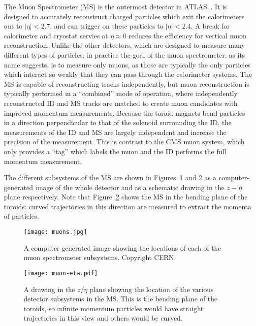 The Muon Spectrometer (MS) is the outermost detector in ATLAS~\cite{ATLASPaper}. It is designed to accurately reconstruct charged particles which exit the calorimeters out to $|\eta| < 2.7$, and can trigger on these particles to $|\eta| < 2.4$. A break for calorimeter and cryostat servies at $\eta \approx 0$ reduces the efficiency for vertical muon reconstruction.  Unlike the other detectors, which are designed to measure many different types of particles, in practice the goal of the muon spectrometer, as its name suggests, is to measure only muons, as those are typically the only particles which interact so weakly that they can pass through the calorimeter systems. The MS is capable of reconstructing tracks independently, but muon reconstruction is typically performed in a ``combined'' mode of operation, where independently reconstructed ID and MS tracks are matched to create muon candidates with improved momentum measurements. Because the toroid magnets bend particles in a direction perpendicular to that of the solenoid surrounding the ID, the measurements of the ID and MS are largely independent and increase the precision of the measurement. This is contrast to the CMS muon system, which only provides a ``tag'' which labels the muon and the ID performs the full momentum measurement.

The different subsystems of the MS are shown in Figures~\ref{fig:detector:ms} and \ref{fig:detector:ms-eta} as a computer-generated image of the whole detector and as a schematic drawing in the $z-\eta$ plane respectively. Note that Figure~\ref{fig:detector:ms-eta} shows the MS in the bending plane of the toroids: curved trajectories in this direction are measured to extract the momenta of particles. 



\begin{figure}
\centering
\texttt{[image: muons.jpg]}
\label{fig:detector:ms}
\caption{A computer generated image showing the locations of each of the muon spectrometer subsystems. Copyright CERN.}
\end{figure}



\begin{figure}
\centering
\texttt{[image: muon-eta.pdf]}
\label{fig:detector:ms-eta}
\caption{A drawing in the $z/\eta$ plane showing the location of the various detector subsystems in the MS. This is the bending plane of the toroids, so infinite momentum particles would have straight trajectories in this view and others would be curved.}
\end{figure}

